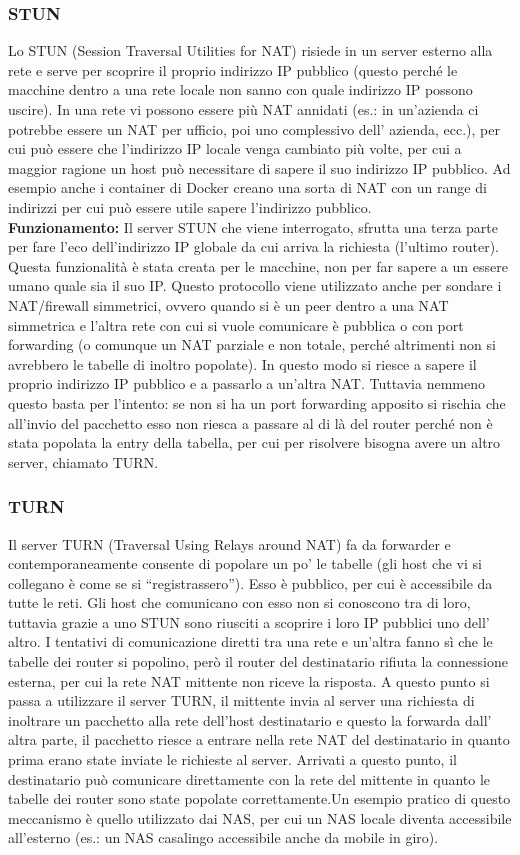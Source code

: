 \subsubsection{STUN}
Lo STUN (Session Traversal Utilities for NAT) risiede in un server esterno alla rete e serve per scoprire il proprio indirizzo IP pubblico (questo perché le macchine dentro a una rete locale non sanno con quale indirizzo IP possono uscire). In una rete vi possono essere più NAT annidati (es.: in un’azienda ci potrebbe essere un NAT per ufficio, poi uno complessivo dell’ azienda, ecc.), per cui può essere che l’indirizzo IP locale venga cambiato più volte, per cui a maggior ragione un host può necessitare di sapere il suo indirizzo IP pubblico. Ad esempio anche i container di Docker creano una sorta di NAT con un range di indirizzi per cui può essere utile sapere l’indirizzo pubblico. \\
\textbf{Funzionamento:}
Il server STUN che viene interrogato, sfrutta una terza parte per fare l’eco dell’indirizzo IP globale da cui arriva la richiesta (l’ultimo router). Questa funzionalità è stata creata per le macchine, non per far sapere a un essere umano quale sia il suo IP. Questo protocollo viene utilizzato anche per sondare i NAT/firewall simmetrici, ovvero quando si è un peer dentro a una NAT simmetrica e l’altra rete con cui si vuole comunicare è pubblica o con port forwarding (o comunque un NAT parziale e non totale, perché altrimenti non si avrebbero le tabelle di inoltro popolate). In questo modo si riesce a sapere il proprio indirizzo IP pubblico e a passarlo a un’altra NAT. Tuttavia nemmeno questo basta per l’intento: se non si ha un port forwarding apposito si rischia che all’invio del pacchetto esso non riesca a passare al di là del router perché non è stata popolata la entry della tabella, per cui per risolvere bisogna avere un altro server, chiamato TURN.
\subsubsection{TURN}
Il server TURN (Traversal Using Relays around NAT) fa da forwarder e contemporaneamente consente di popolare un po’ le tabelle (gli host che vi si collegano è come se si “registrassero”). Esso è pubblico, per cui è accessibile da tutte le reti. Gli host che comunicano con esso non si conoscono tra di loro, tuttavia grazie a uno STUN sono riusciti a scoprire i loro IP pubblici uno dell’ altro. I tentativi di comunicazione diretti tra una rete e un’altra fanno sì che le tabelle dei router si popolino, però il router del destinatario rifiuta la connessione esterna, per cui la rete NAT mittente non riceve la risposta. A questo punto si passa a utilizzare il server TURN, il mittente invia al server una richiesta di inoltrare un pacchetto alla rete dell’host destinatario e questo la forwarda dall’ altra parte, il pacchetto riesce a entrare nella rete NAT del destinatario in quanto prima erano state inviate le richieste al server. Arrivati a questo punto, il destinatario può comunicare direttamente con la rete del mittente in quanto le tabelle dei router sono state popolate correttamente.Un esempio pratico di questo meccanismo è quello utilizzato dai NAS, per cui un NAS locale diventa accessibile all’esterno (es.: un NAS casalingo accessibile anche da mobile in giro).
